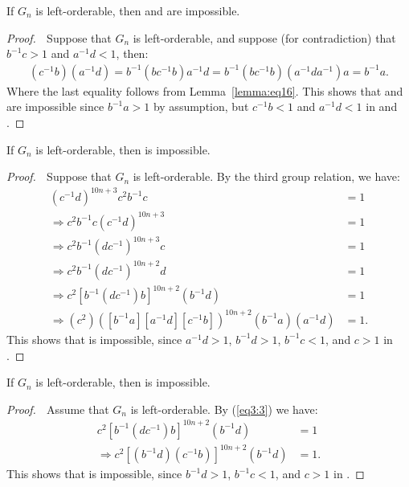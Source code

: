 \begin{proposition} If $G_n$ is left-orderable, then  and  are impossible.
\end{proposition}
\begin{proof} $\;$ Suppose that $G_n$ is left-orderable, and suppose (for contradiction) that $b^{-1}c>1$ and $a^{-1}d<1$, then:
\begin{align*}
(c^{-1}b)(a^{-1}d)=b^{-1}(bc^{-1}b)a^{-1}d=b^{-1}(bc^{-1}b)(a^{-1}da^{-1})a=b^{-1}a.
\end{align*}
Where the last equality follows from Lemma~\ref{lemma:eq16}. This shows that  and  are impossible since $b^{-1}a>1$ by assumption, but $c^{-1}b<1$ and $a^{-1}d<1$ in  and .
\end{proof}

\begin{proposition} If $G_n$ is left-orderable, then  is impossible.
\end{proposition}
\begin{proof} $\;$ Suppose that $G_n$ is left-orderable. By the third group relation, we have:
\begin{align}
(c^{-1}d)^{10n+3}c^2b^{-1}c&=1\nonumber{}\\
\Rightarrow{}c^2b^{-1}c(c^{-1}d)^{10n+3}&=1\nonumber{}\\
\Rightarrow{}c^2b^{-1}(dc^{-1})^{10n+3}c&=1\label{eq3:2}\\
\Rightarrow{}c^2b^{-1}(dc^{-1})^{10n+2}d&=1\nonumber{}\\
\Rightarrow{}c^2[b^{-1}(dc^{-1})b]^{10n+2}(b^{-1}d)&=1\label{eq3:3}\\
\Rightarrow{}(c^2)([b^{-1}a][a^{-1}d][c^{-1}b])^{10n+2}(b^{-1}a)(a^{-1}d)&=1.\nonumber{}
\end{align}
This shows that  is impossible, since $a^{-1}d>1$, $b^{-1}d>1$, $b^{-1}c<1$, and $c>1$ in .
\end{proof}

\begin{proposition} If $G_n$ is left-orderable, then  is impossible.
\end{proposition}
\begin{proof} $\;$ Assume that $G_n$ is left-orderable. By (\ref{eq3:3}) we have:
\begin{align*}
c^2[b^{-1}(dc^{-1})b]^{10n+2}(b^{-1}d)&=1\\
\Rightarrow{}c^2[(b^{-1}d)(c^{-1}b)]^{10n+2}(b^{-1}d)&=1.
\end{align*}
This shows that  is impossible, since $b^{-1}d>1$, $b^{-1}c<1$, and $c>1$ in .
\end{proof}

